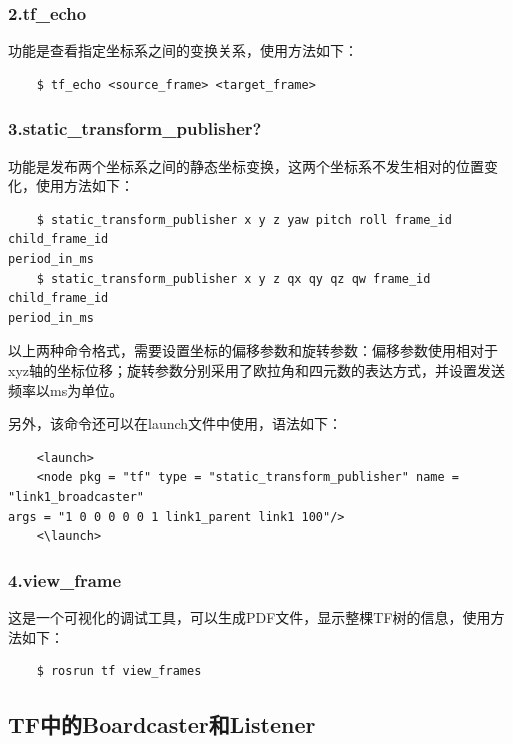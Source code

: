 \documentclass[10pt, oneside]{book}
\begin{document}
\subsubsection{2.tf\_echo}

功能是查看指定坐标系之间的变换关系，使用方法如下：

\begin{verbatim}
    $ tf_echo <source_frame> <target_frame>
\end{verbatim}

\subsubsection{3.static\_transform\_publisher?}

功能是发布两个坐标系之间的静态坐标变换，这两个坐标系不发生相对的位置变化，使用方法如下：

\begin{verbatim}
    $ static_transform_publisher x y z yaw pitch roll frame_id child_frame_id 
period_in_ms
    $ static_transform_publisher x y z qx qy qz qw frame_id child_frame_id 
period_in_ms
\end{verbatim}

以上两种命令格式，需要设置坐标的偏移参数和旋转参数：偏移参数使用相对于xyz轴的坐标位移；旋转参数分别采用了欧拉角和四元数的表达方式，并设置发送频率以ms为单位。

另外，该命令还可以在launch文件中使用，语法如下：

\begin{verbatim}
    <launch>
    <node pkg = "tf" type = "static_transform_publisher" name = "link1_broadcaster" 
args = "1 0 0 0 0 0 1 link1_parent link1 100"/>
    <\launch>
\end{verbatim}

\subsubsection{4.view\_frame}

这是一个可视化的调试工具，可以生成PDF文件，显示整棵TF树的信息，使用方法如下：

\begin{verbatim}
    $ rosrun tf view_frames
\end{verbatim}

\subsection{TF中的Boardcaster和Listener}
\end{document}
